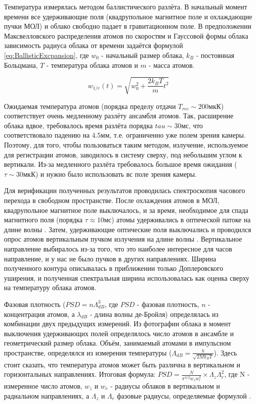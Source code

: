 Температура измерялась методом баллистического разлёта.
В начальный момент времени все удерживающие поля (квадрупольное магнитное поле и охлаждающие пучки МОЛ) и облако свободно падает в гравитационном поле. 
В предположении Максвелловского распределения атомов по скоростям и Гауссовой формы облака зависимость радиуса облака от времени задаётся формулой \ref{eq:BallisticExcpansion}, где $w_0$ - начальный размер облака, $k_B$ - постоянная Больцмана, $T$ - температура облака атомов и $m$ - масса атомов.

\begin{equation}
	\label{eq:BallisticExcpansion}
	w_{1/e}(t) = \sqrt{w_0^2 + \frac{2k_B T}{m}t^2}
\end{equation}


Ожидаемая температура атомов (порядка пределу отдачи $T_{rec} \sim 200\unit{мкК}$) соответствует очень медленному разлёту ансамбля атомов.
Так, расширение облака вдвое, требовалось время разлёта порядка $tau \sim 30\unit{мс}$, что соответствовало падению на $4.5\unit{мм}$, т.е. ограниченно уже полем зрения камеры.
Поэтому, для того, чтобы пользоваться таким методом, излучение, используемое для регистрации атомов, заводилось в систему сверху, под небольшим углом к вертикали.
Из-за медленного разлёта требовалось большое время ожидания ($\tau \sim 30\unit{мкК}$) и нужно было использовать вс поле зрения камеры. 

Для верификации полученных результатов проводилась спектроскопия часового перехода в свободном пространстве. 
После охлаждения атомов в МОЛ, квадрупольное магнитное поле выключалось, и за время, необходимое для спада магнитного поля (порядка $\tau\approx10\unit{мс}$) атомы удерживались в оптической патоке на длине волны \thd. 
Затем, удерживающие оптические поля выключались и проводился опрос атомов вертикальным пучком излучения на длине волны \clck. 
Вертикальное направление выбиралось из-за того, что это наиболее интересное для часов направление, и у нас не было пучков в других направлениях. 
Ширина полученного контура описывалась в приближении только Доплеровского уширения, и полученная спектральная ширина использовалась как оценка сверху на температуру облака атомов.

Фазовая плотность ($PSD = n\Lambda_{dB}^3$, где $PSD$ - фазовая плотность, $n$ - концентрация атомов, а $\lambda_{dB}$ - длина волны де-Бройля) определялась из комбинации двух предыдущих измерений. 
Из фотографии облака в момент выключения удерживающих полей определялось число атомов в ансамбле и геометрический размер облака. 
Объём, занимаемый атомами в импульсном пространстве, определялся из измерения температуры ($\Lambda_{dB} = \frac{h}{\sqrt{2M k_B T}}$). 
Здесь стоит сказать, что температура атомов может быть различна в вертикальном и горизонтальных направлениях. 
Итоговая формула: $PSD = \frac{N}{\pi^{3/2} w_z w_r^2} \times \Lambda_z \Lambda_r^2$, где N - измеренное число атомов, $w_z$ и $w_r$ - радиусы облаков в вертикальном и радиальном направлениях, а $\Lambda_z$ и $\Lambda_r$ фазовые радиусы, определяемые формулой . 

